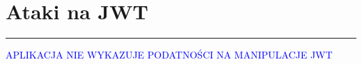 \section{Ataki na JWT}



{\rule{\linewidth}{0.2mm}}
\begin{center}
    \textcolor{blue}{APLIKACJA NIE WYKAZUJE PODATNOŚCI NA MANIPULACJE JWT}
\end{center} 
